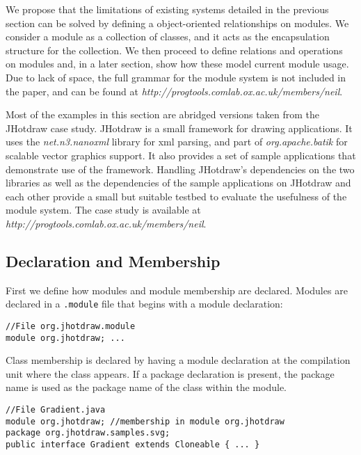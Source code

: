 
We propose that the limitations of existing systems detailed in the previous section
can be solved by defining a object-oriented relationships on modules. 
We consider a module as a collection of classes, and it acts as the encapsulation
structure for the collection. We then proceed to define
relations and operations on modules and, in a later section, show how
these model current module usage. Due to lack of space, the full grammar for
the module system is not included in the paper, and can be found at
\textit{http://progtools.comlab.ox.ac.uk/members/neil}.

Most of the examples in this section are abridged versions taken from the JHotdraw case study. 
JHotdraw\cite{jhotdraw} is a small framework for drawing applications. It
uses the \textit{net.n3.nanoxml} library for xml parsing, and part of 
\textit{org.apache.batik} for scalable vector graphics support. It also
provides a set of sample applications that demonstrate use of the framework.
Handling JHotdraw's dependencies on the two libraries as well as the dependencies
of the sample applications on JHotdraw and each other provide a small but
suitable testbed to evaluate the usefulness of the module system.
The case study is available at \textit{http://progtools.comlab.ox.ac.uk/members/neil}. 

\subsection{Declaration and Membership}

First we define how modules and module membership are declared. 
Modules are declared in a {\tt .module} file that begins with a module
declaration:

\begin{lstlisting}
//File org.jhotdraw.module
module org.jhotdraw; ...
\end{lstlisting}

Class membership is declared by having a module declaration at the compilation unit where 
the class appears.  If a package declaration is present, 
the package name is used as the package name of the class within the module.

\begin{lstlisting}
//File Gradient.java
module org.jhotdraw; //membership in module org.jhotdraw
package org.jhotdraw.samples.svg;
public interface Gradient extends Cloneable { ... }
\end{lstlisting}

